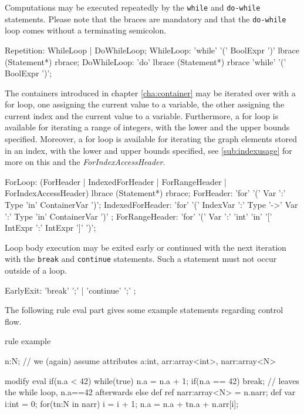 Computations may be executed repeatedly by the \texttt{while} and \texttt{do-while} statements. Please note that the braces are mandatory and that the \texttt{do-while} loop comes without a terminating semicolon.

\begin{rail} 
  Repetition: WhileLoop | DoWhileLoop;
	WhileLoop: 'while' '(' BoolExpr ')' lbrace (Statement*) rbrace;
	DoWhileLoop: 'do' lbrace (Statement*) rbrace 'while' '(' BoolExpr ')';
\end{rail}


The containers introduced in chapter \ref{cha:container} may be iterated over with a for loop, one assigning the current value to a variable, the other assigning the current index and the current value to a variable.
Furthermore, a for loop is available for iterating a range of integers, with the lower and the upper bounds specified.
Moreover, a for loop is available for iterating the graph elements stored in an index, with the lower and upper bounds specified, see \ref{sub:indexusage} for more on this and the \emph{ForIndexAccessHeader}.
\begin{rail}
  ForLoop: (ForHeader | IndexedForHeader | ForRangeHeader | ForIndexAccessHeader) lbrace (Statement*) rbrace;
  ForHeader: 'for' '(' Var ':' Type 'in' ContainerVar ')';
  IndexedForHeader: 'for' '(' IndexVar ':' Type '->' Var ':' Type 'in' ContainerVar ')' ;
  ForRangeHeader: 'for' '(' Var ':' 'int' 'in' '[' IntExpr ':' IntExpr ']' ')';
\end{rail}

Loop body execution may be exited early or continued with the next iteration with the \texttt{break} and \texttt{continue} statements. Such a statement must not occur outside of a loop.

\begin{rail} 
  EarlyExit: 
	'break' ';' |	'continue' ';'
	;
\end{rail}

\begin{example}
The following rule eval part gives some example statements regarding control flow.
  \begin{grgen}
rule example
{
  n:N; // we (again) assume attributes a:int, arr:array<int>, narr:array<N>
	
	modify {
		eval {
			if(n.a < 42) {
				while(true) {
					n.a = n.a + 1;
					if(n.a == 42) {
						break; // leaves the while loop, n.a==42 afterwards
					}
				}
			} else {
				def ref narr:array<N> = n.narr;
				def var i:int = 0;
				for(tn:N in narr) {
					i = i + 1;
					n.a = n.a + tn.a + n.arr[i];
				}
			}
		}
	}
}
  \end{grgen}
\end{example}


